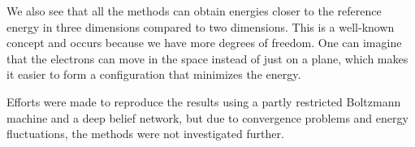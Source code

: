 We also see that all the methods can obtain energies closer to the reference energy in three dimensions compared to two dimensions. This is a well-known concept and occurs because we have more degrees of freedom. One can imagine that the electrons can move in the space instead of just on a plane, which makes it easier to form a configuration that minimizes the energy. 

Efforts were made to reproduce the results using a partly restricted Boltzmann machine and a deep belief network, but due to convergence problems and energy fluctuations, the methods were not investigated further. 

\begin{figure}
	\centering
	\captionsetup[subfigure]{labelformat=empty}
	\hspace{0.1cm}
	\hspace{-0.0cm}
	\\
	

\end{figure}
